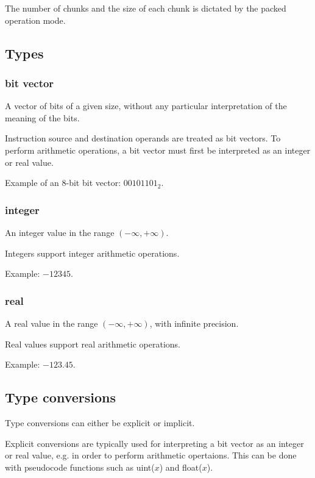 The number of chunks and the size of each chunk is dictated by the packed
operation mode.


\subsection{Types}

\subsubsection{bit vector}

A vector of bits of a given size, without any particular interpretation of the
meaning of the bits.

Instruction source and destination operands are treated as bit vectors. To
perform arithmetic operations, a bit vector must first be interpreted as an
integer or real value.

Example of an 8-bit bit vector: $00101101_2$.

\subsubsection{integer}

An integer value in the range $(-\infty, +\infty)$.

Integers support integer arithmetic operations.

Example: $-12345$.

\subsubsection{real}

A real value in the range $(-\infty, +\infty)$, with infinite precision.

Real values support real arithmetic operations.

Example: $-123.45$.

\subsection{Type conversions}

Type conversions can either be explicit or implicit.

Explicit conversions are typically used for interpreting a bit vector as an
integer or real value, e.g. in order to perform arithmetic opertaions. This can
be done with pseudocode functions such as uint($x$) and float($x$).

